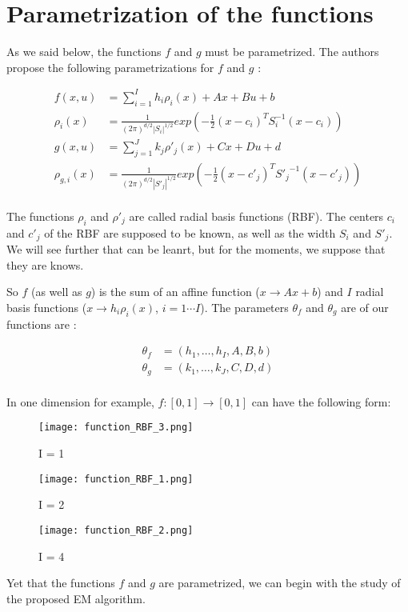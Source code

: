 \section{Parametrization of the functions}

As we said below, the functions $f$ and $g$ must be parametrized.
The authors propose the following parametrizations for $f$ and $g$ :

\begin{align*}
  f(x,u) &= \sum_{i=1}^I h_i \rho_i(x) + Ax + Bu + b\\
  \rho_i(x) &= \frac{1}{(2\pi)^{d/2}|S_i|^{1/2}} exp\left(-\frac{1}{2}(x-c_i)^T S_{i}^{-1}(x-c_i)\right)\\
  g(x,u) &= \sum_{j=1}^J k_j \rho'_j(x) + Cx + Du + d\\
  \rho_{g,i}(x) &= \frac{1}{(2\pi)^{d/2}|S'_j|^{1/2}} exp\left(-\frac{1}{2}(x-c'_j)^T {S'_{j}}^{-1}(x-c'_j)\right)\\
\end{align*}

The functions $\rho_i$ and $\rho'_j$ are called radial basis functions (RBF).
The centers $c_i$ and $c'_j$ of the RBF are supposed to be known, as well as the width $S_i$ and $S'_j$.
We will see further that can be leanrt, but for the moments, we suppose that they are knows.


So $f$ (as well as $g$) is the sum of an affine function ($x \rightarrow Ax + b$) and $I$ radial basis functions ($x \rightarrow h_i\rho_i(x)$, $i=1 \cdots I$).
The parameters $\theta_f$ and $\theta_g$ are of our functions are :

\begin{align*}
  \theta_f &= \left( h_1, \ldots , h_I, A, B, b\right) \\
  \theta_g &= \left( k_1, \ldots , k_J, C, D, d\right) \\
\end{align*}

In one dimension for example, $f : \left[0,1\right] \rightarrow \left[0,1\right]$ can have the following form:

\begin{figure}[H]
\captionsetup{labelformat=empty}
  \texttt{[image: function\_RBF\_3.png]}
  \caption{I = 1}
\endminipage\hfill
{}
  \texttt{[image: function\_RBF\_1.png]}
  \caption{I = 2}
\endminipage\hfill
{}
  \texttt{[image: function\_RBF\_2.png]}
  \caption{I = 4}
\endminipage\hfill
\end{figure}

Yet that the functions $f$ and $g$ are parametrized, we can begin with the study of the proposed EM algorithm.
